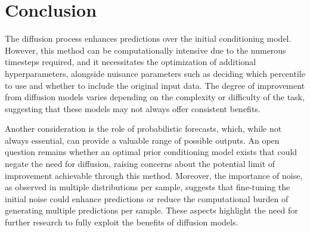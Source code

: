 \documentclass{article}
\begin{document}
\section{Conclusion}

The diffusion process enhances predictions over the initial conditioning model. However, this method can be computationally intensive due to the numerous timesteps required, and it necessitates the optimization of additional hyperparameters, alongside nuisance parameters such as deciding which percentile to use and whether to include the original input data. The degree of improvement from diffusion models varies depending on the complexity or difficulty of the task, suggesting that these models may not always offer consistent benefits.

Another consideration is the role of probabilistic forecasts, which, while not always essential, can provide a valuable range of possible outputs. An open question remains whether an optimal prior conditioning model exists that could negate the need for diffusion, raising concerns about the potential limit of improvement achievable through this method. Moreover, the importance of noise, as observed in multiple distributions per sample, suggests that fine-tuning the initial noise could enhance predictions or reduce the computational burden of generating multiple predictions per sample. These aspects highlight the need for further research to fully exploit the benefits of diffusion models.





\printbibliography
\end{document}
